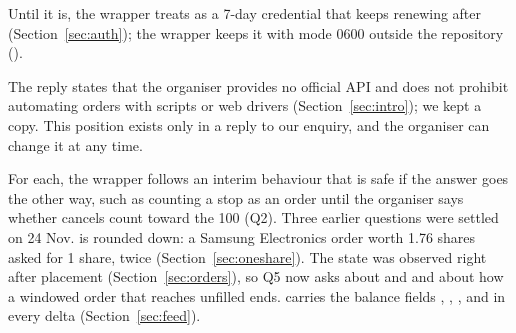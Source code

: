  Until it is, the wrapper treats  as a 7-day credential that keeps renewing after  (Section~\ref{sec:auth}); the wrapper keeps it with mode 0600 outside the repository ().

 The reply states that the organiser provides no official API and does not prohibit automating orders with scripts or web drivers (Section~\ref{sec:intro}); we kept a copy. This position exists only in a reply to our enquiry, and the organiser can change it at any time.

 For each, the wrapper follows an interim behaviour that is safe if the answer goes the other way, such as counting a stop as an order until the organiser says whether cancels count toward the 100 (Q2). Three earlier questions were settled on 24 Nov.  is rounded down: a Samsung Electronics order worth 1.76 shares asked for 1 share, twice (Section~\ref{sec:oneshare}). The state  was observed right after placement (Section~\ref{sec:orders}), so Q5 now asks about  and  and about how a windowed order that reaches  unfilled ends.  carries the balance fields , , ,  and  in every delta (Section~\ref{sec:feed}).



